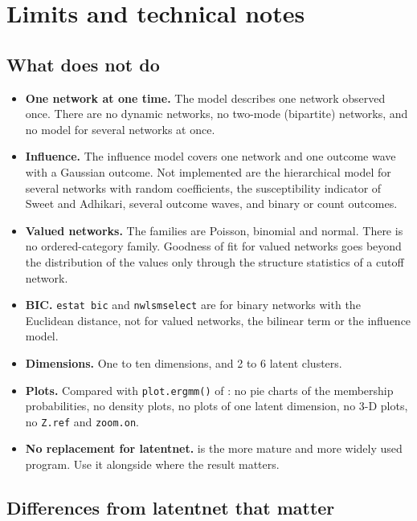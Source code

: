 \chapter{Limits and technical notes}\label{ch:limits}

\section{What \texorpdfstring{\nwlsm}{nwlsm}{} does not do}

\begin{itemize}[nosep]
  \item \textbf{One network at one time.} The model describes one network observed once. There are no dynamic networks, no two-mode (bipartite) networks, and no model for several networks at once.
  \item \textbf{Influence.} The influence model covers one network and one outcome wave with a Gaussian outcome. Not implemented are the hierarchical model for several networks with random coefficients, the susceptibility indicator of Sweet and Adhikari, several outcome waves, and binary or count outcomes.
  \item \textbf{Valued networks.} The families are Poisson, binomial and normal. There is no ordered-category family. Goodness of fit for valued networks goes beyond the distribution of the values only through the structure statistics of a cutoff network.
  \item \textbf{BIC.} \texttt{estat bic} and \texttt{nwlsmselect} are for binary networks with the Euclidean distance, not for valued networks, the bilinear term or the influence model.
  \item \textbf{Dimensions.} One to ten dimensions, and 2 to 6 latent clusters.
  \item \textbf{Plots.} Compared with \texttt{plot.ergmm()} of \latentnet{}: no pie charts of the membership probabilities, no density plots, no plots of one latent dimension, no 3-D plots, no \texttt{Z.ref} and \texttt{zoom.on}.
  \item \textbf{No replacement for latentnet.} \latentnet{} is the more mature and more widely used program. Use it alongside \nwlsm{} where the result matters.
\end{itemize}

\section{Differences from latentnet that matter}

